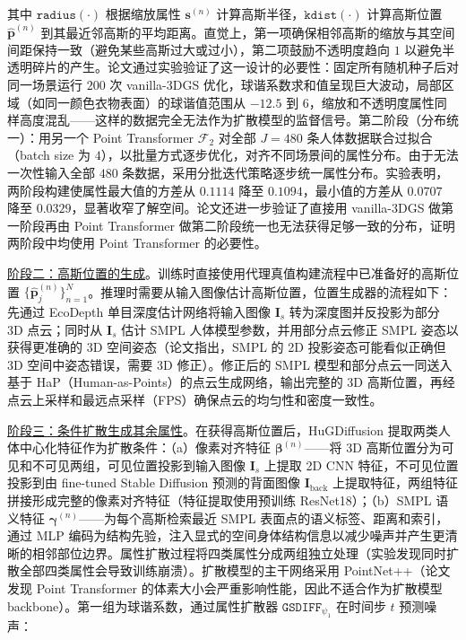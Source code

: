 其中 $\mathtt{radius}(\cdot)$ 根据缩放属性 $\mathbf{s}^{(n)}$ 计算高斯半径，$\mathtt{kdist}(\cdot)$ 计算高斯位置 $\hat{\mathbf{p}}^{(n)}$ 到其最近邻高斯的平均距离。直觉上，第一项确保相邻高斯的缩放与其空间间距保持一致（避免某些高斯过大或过小），第二项鼓励不透明度趋向 $1$ 以避免半透明碎片的产生。论文通过实验验证了这一设计的必要性：固定所有随机种子后对同一场景运行 $200$ 次 vanilla-3DGS 优化，球谐系数求和值呈现巨大波动，局部区域（如同一颜色衣物表面）的球谐值范围从 $-12.5$ 到 $6$，缩放和不透明度属性同样高度混乱——这样的数据完全无法作为扩散模型的监督信号。第二阶段（分布统一）：用另一个 Point Transformer $\mathcal{F}_2$ 对全部 $J = 480$ 条人体数据联合过拟合（batch size 为 $4$），以批量方式逐步优化，对齐不同场景间的属性分布。由于无法一次性输入全部 $480$ 条数据，采用分批迭代策略逐步统一属性分布。实验表明，两阶段构建使属性最大值的方差从 $0.1114$ 降至 $0.1094$，最小值的方差从 $0.0707$ 降至 $0.0329$，显著收窄了解空间。论文还进一步验证了直接用 vanilla-3DGS 做第一阶段再由 Point Transformer 做第二阶段统一也无法获得足够一致的分布，证明两阶段中均使用 Point Transformer 的必要性。

\underline{阶段二：高斯位置的生成}。训练时直接使用代理真值构建流程中已准备好的高斯位置 $\{\hat{\mathbf{p}}_j^{(n)}\}_{n=1}^N$。推理时需要从输入图像估计高斯位置，位置生成器的流程如下：先通过 EcoDepth 单目深度估计网络将输入图像 $\mathbf{I}_s$ 转为深度图并反投影为部分 3D 点云；同时从 $\mathbf{I}_s$ 估计 SMPL 人体模型参数，并用部分点云修正 SMPL 姿态以获得更准确的 3D 空间姿态（论文指出，SMPL 的 2D 投影姿态可能看似正确但 3D 空间中姿态错误，需要 3D 修正）。修正后的 SMPL 模型和部分点云一同送入基于 HaP（Human-as-Points）的点云生成网络，输出完整的 3D 高斯位置，再经点云上采样和最远点采样（FPS）确保点云的均匀性和密度一致性。

\underline{阶段三：条件扩散生成其余属性}。在获得高斯位置后，HuGDiffusion 提取两类人体中心化特征作为扩散条件：（a）像素对齐特征 $\bm{\beta}^{(n)}$——将 3D 高斯位置分为可见和不可见两组，可见位置投影到输入图像 $\mathbf{I}_s$ 上提取 2D CNN 特征，不可见位置投影到由 fine-tuned Stable Diffusion 预测的背面图像 $\mathbf{I}_\text{back}$ 上提取特征，两组特征拼接形成完整的像素对齐特征（特征提取使用预训练 ResNet18）；（b）SMPL 语义特征 $\bm{\gamma}^{(n)}$——为每个高斯检索最近 SMPL 表面点的语义标签、距离和索引，通过 MLP 编码为结构先验，注入显式的空间身体结构信息以减少噪声并产生更清晰的相邻部位边界。属性扩散过程将四类属性分成两组独立处理（实验发现同时扩散全部四类属性会导致训练崩溃）。扩散模型的主干网络采用 PointNet++（论文发现 Point Transformer 的体素大小会严重影响性能，因此不适合作为扩散模型 backbone）。第一组为球谐系数，通过属性扩散器 $\mathtt{GSDIFF}_{\psi_1}$ 在时间步 $t$ 预测噪声：


